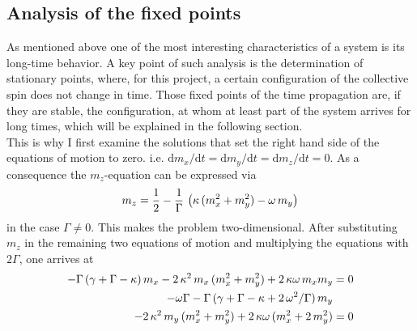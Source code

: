 \subsection{Analysis of the fixed points}
As mentioned above one of the most interesting characteristics of a system is its long-time behavior. A key point of such analysis is the determination of stationary points, where, for this project, a certain configuration of the collective spin does not change in time. Those fixed points of the time propagation are, if they are stable, the configuration, at whom at least part of the system arrives for long times, which will be explained in the following section. \\
This is why I first examine the solutions that set the right hand side of the equations of motion to zero. i.e. $\text{d}m_x/\text{d}t=\text{d}m_y/\text{d}t=\text{d}m_z/\text{d}t=0$. As a consequence the $m_z$-equation can be expressed via
\begin{align}
    m_z=\frac{1}{2}-\frac{1}{\Gamma}\,\left(\kappa\,(m_x^2+ m_y^2)-\omega\,m_y  \right)
\end{align}
in the case $\Gamma\neq0$. This makes the problem two-dimensional. After substituting $m_z$ in the remaining two equations of motion and multiplying the equations with $2\Gamma$, one arrives at
\begin{align}-\Gamma\,(\gamma+\Gamma-\kappa)\,m_x-2\,\kappa^2\,m_x\,( m_x^2+ m_y^2)+2\,\kappa\omega\,m_xm_y  &=0\notag\\%
   -\omega\Gamma-\Gamma\,(\gamma+\Gamma-\kappa+2\,\omega^2/\Gamma)\,m_y&\notag\\
    -2\,\kappa^2\,m_y\,( m_x^2+ m_y^2)+2\,\kappa\omega\,(m_x^2+2\,m_y^2)  &=0\label{eq:del0_stat}
\end{align}
